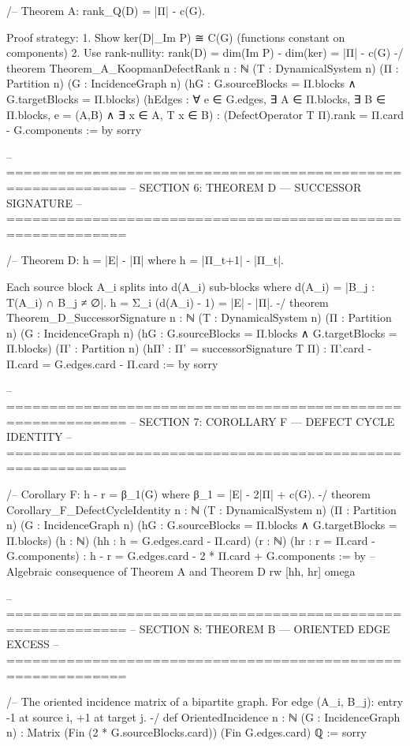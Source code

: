 /-- Theorem A: rank_Q(D) = |Π| - c(G).
    
    Proof strategy:
    1. Show ker(D|_{Im P}) ≅ C(G) (functions constant on components)
    2. Use rank-nullity: rank(D) = dim(Im P) - dim(ker) = |Π| - c(G)
-/
theorem Theorem_A_KoopmanDefectRank {n : ℕ} (T : DynamicalSystem n) (Π : Partition n)
    (G : IncidenceGraph n) (hG : G.sourceBlocks = Π.blocks ∧ G.targetBlocks = Π.blocks)
    (hEdges : ∀ e ∈ G.edges, ∃ A ∈ Π.blocks, ∃ B ∈ Π.blocks, e = (A,B) ∧ ∃ x ∈ A, T x ∈ B) :
    (DefectOperator T Π).rank = Π.card - G.components := by
  sorry

-- ============================================================
-- SECTION 6: THEOREM D — SUCCESSOR SIGNATURE
-- ============================================================

/-- Theorem D: h = |E| - |Π| where h = |Π_{t+1}| - |Π_t|.
    
    Each source block A_i splits into d(A_i) sub-blocks where
    d(A_i) = |{B_j : T(A_i) ∩ B_j ≠ ∅}|.
    h = Σ_i (d(A_i) - 1) = |E| - |Π|.
-/
theorem Theorem_D_SuccessorSignature {n : ℕ} (T : DynamicalSystem n) (Π : Partition n)
    (G : IncidenceGraph n) (hG : G.sourceBlocks = Π.blocks ∧ G.targetBlocks = Π.blocks)
    (Π' : Partition n) (hΠ' : Π' = successorSignature T Π) :
    Π'.card - Π.card = G.edges.card - Π.card := by
  sorry

-- ============================================================
-- SECTION 7: COROLLARY F — DEFECT CYCLE IDENTITY
-- ============================================================

/-- Corollary F: h - r = β_1(G) where β_1 = |E| - 2|Π| + c(G). -/
theorem Corollary_F_DefectCycleIdentity {n : ℕ} (T : DynamicalSystem n) (Π : Partition n)
    (G : IncidenceGraph n) (hG : G.sourceBlocks = Π.blocks ∧ G.targetBlocks = Π.blocks)
    (h : ℕ) (hh : h = G.edges.card - Π.card)
    (r : ℕ) (hr : r = Π.card - G.components) :
    h - r = G.edges.card - 2 * Π.card + G.components := by
  -- Algebraic consequence of Theorem A and Theorem D
  rw [hh, hr]
  omega

-- ============================================================
-- SECTION 8: THEOREM B — ORIENTED EDGE EXCESS
-- ============================================================

/-- The oriented incidence matrix of a bipartite graph.
    For edge (A_i, B_j): entry -1 at source i, +1 at target j. -/
def OrientedIncidence {n : ℕ} (G : IncidenceGraph n) : Matrix (Fin (2 * G.sourceBlocks.card)) (Fin G.edges.card) ℚ :=
  sorry

